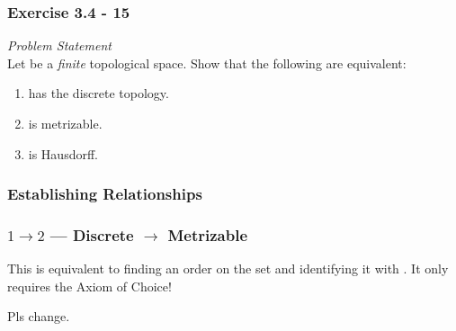 

\begin{frame}
    \frametitle{Exercise 3.4 - 15}
    \textit{Problem Statement}\\
    Let \topx be a \emph{finite} topological space. Show that the following are
    equivalent:
    \begin{enumerate}
        \item \topx has the discrete topology.
        \item \topx is metrizable.
        \item \topx is Hausdorff.
    \end{enumerate}
\end{frame}

\begin{frame}
    \frametitle{Establishing Relationships}
    \centering

\end{frame}

\begin{frame}
    \frametitle{\(1 \rightarrow 2\) --- Discrete \(\rightarrow\) Metrizable}

    \begin{figure}
        \scalebox{1.4}{}
    \end{figure}

    \pause
    This is equivalent to finding an order on the set and identifying it with
    \naturals. It only requires the Axiom of Choice!

    Pls change.

\end{frame}

